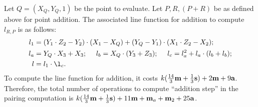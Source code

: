 Let $Q = (X_Q,Y_Q,1)$ be the point to evaluate.
Let $P,R,(P+R)$ be as defined above for point addition.
The associated line function for addition
to compute $l_{R,P}$ is as follows:
\begin{align*}
l_1 &= (Y_1 \cdot Z_2 - Y_2) \cdot (X_1 - X_Q) + (Y_Q - Y_1) \cdot (X_1 \cdot Z_2 - X_2);\\
l_a &= Y_Q \cdot X_3 + X_3;\	\quad
l_b = X_Q \cdot (Y_3 + Z_3);\	\quad
l_c = l_a^2 + l_a \cdot (l_b + l_b);\\
l &= l_1 \cdot \l_c.
\end{align*}
To compute the line function for addition,
it costs
$k(\frac{14}{3}\textbf{m} + \frac{1}{3}\textbf{s}) + 2\textbf{m} + 9\textbf{a}$.
Therefore, the total number of operations to compute ``addition step'' in the pairing computation is
$k(\frac{14}{3}\textbf{m} + \frac{1}{3}\textbf{s}) + 11\textbf{m} + \textbf{m}_{a} + \textbf{m}_{2} + 25\textbf{a}$.




